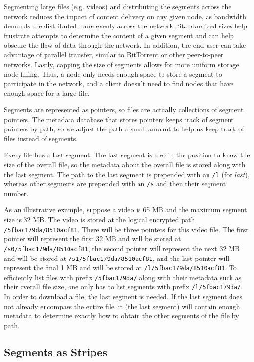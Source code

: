 \documentclass[11pt,fleqn,openany]{book}
\begin{document}
Segmenting large files (e.g. videos) and distributing the segments
across the network reduces the impact of content delivery on any
given node, as
bandwidth demands are distributed more evenly across the network.
Standardized sizes help frustrate attempts to determine the content of a given
segment and can help obscure the flow of data through the network.
In addition, the end user can take advantage of parallel transfer, similar to
BitTorrent or other peer-to-peer networks. Lastly, capping the size of segments
allows for more uniform storage node filling. Thus, a node only needs enough
space to store a segment to participate in the network,
and a client doesn't need
to find nodes that have enough space for a large file.

Segments are represented as pointers, so files are actually
collections of segment pointers. The metadata database that stores
pointers keeps track of segment pointers by path, so we adjust the
path a small amount to help us keep track of files instead of
segments.

Every file has a last segment. The last segment is also in the
position to know the size of the overall file, so the metadata about the
overall file is stored along with the last segment. The path to
the last segment is prepended with an {\tt /l} (for {\em last}), whereas
other segments are prepended with an {\tt /s} and then their segment number.

As an illustrative example, suppose a video is 65 MB and the maximum
segment size is 32 MB. The video is stored at the logical encrypted path
{\tt /5fbac179da/8510acf81}. There will be three pointers for this video
file. The first pointer will represent the first 32 MB and will be
stored at {\tt /s0/5fbac179da/8510acf81}, the second pointer will represent
the next 32 MB and will be stored at {\tt /s1/5fbac179da/8510acf81}, and the
last pointer will represent the final 1 MB and will be stored at
{\tt /l/5fbac179da/8510acf81}. To efficiently list files with prefix
{\tt /5fbac179da/} along with their metadata such as their overall file size,
one only has to list segments with prefix {\tt /l/5fbac179da/}. In order to download a
file, the last segment is needed. If the last segment does not already encompass the entire file, it
(the last segment) will contain enough metadata to determine exactly how to obtain the other
segments of the file by path.

\subsection{Segments as Stripes}
\end{document}
